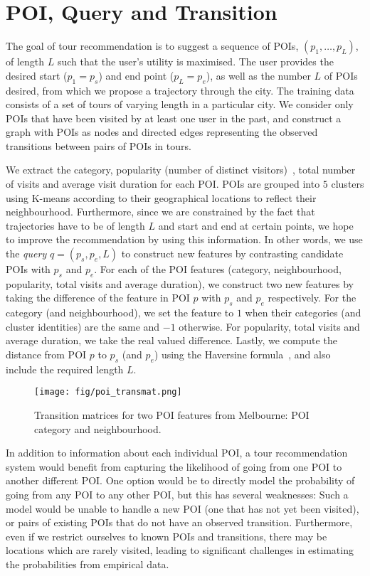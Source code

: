 \section{POI, Query and Transition}
\label{sec:feature}

The goal of tour recommendation is to suggest a sequence of POIs, $(p_1, \ldots, p_L)$, of length $L$ such that the user's utility is maximised. The user provides the desired start ($p_1=p_s$) and end point ($p_L=p_e$), as well as the number $L$ of POIs desired, from which we propose a trajectory through the city.
The training data consists of a set of tours of varying length in a particular city.
We consider only POIs that have been visited by at least one user in the past, and
construct a graph with POIs as nodes and directed edges representing the observed transitions between pairs of POIs in tours. 


We extract the category, popularity (number of distinct visitors)~\cite{ht10}, total number of visits and average visit duration for each POI.
POIs are grouped into $5$ clusters using K-means according to their geographical locations to reflect their neighbourhood.
Furthermore, since we are constrained by the fact that trajectories have to be of length $L$ and start and end at certain points, we hope to improve the recommendation by using this information.
In other words, we use the \textit{query} $q = (p_s, p_e, L)$ to construct new features by contrasting candidate POIs with $p_s$ and $p_e$.
For each of the POI features (category, neighbourhood, popularity, total visits and average duration),
we construct two new features by taking the difference of the feature in POI $p$ with $p_s$ and $p_e$ respectively.
For the category (and neighbourhood), we set the feature to $1$ when their categories (and cluster identities) are the same and $-1$ otherwise.
For popularity, total visits and average duration, we take the real valued difference.
Lastly, we compute the distance from POI $p$ to $p_s$ (and $p_e$) using the Haversine formula~\cite{haversine},
and also include the required length $L$.


\begin{figure}[t]
\texttt{[image: fig/poi\_transmat.png]}
\caption{Transition matrices for two POI features from Melbourne: POI category and neighbourhood.
}
\label{fig:transmat}\captionmoveup
\end{figure}


In addition to information about each individual POI, a tour recommendation system would benefit
from capturing the likelihood of going from one POI to another different POI. One option would be to
directly model the probability of going from any POI to any other POI, but this has several weaknesses:
Such a model would be unable to handle a new POI (one that has not yet been visited),
or pairs of existing POIs that do not have an observed transition.
Furthermore, even if we restrict ourselves to known POIs and transitions,
there may be locations which are rarely visited,
leading to significant challenges in estimating the probabilities from empirical data.

